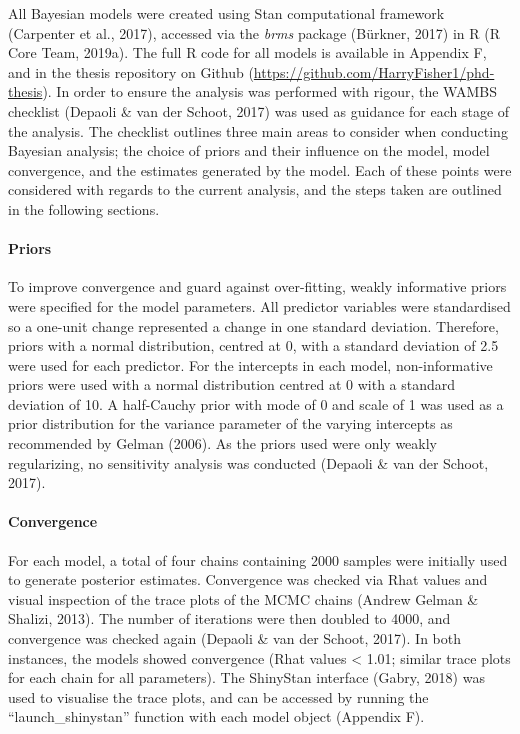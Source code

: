 \documentclass[man,floatsintext]{apa6}
\let\oldparagraph\paragraph
\renewcommand{\paragraph}[1]{\oldparagraph{#1}\mbox{}}
\begin{document}
All Bayesian models were created using Stan computational framework (Carpenter et al., 2017), accessed via the \emph{brms} package (Bürkner, 2017) in R (R Core Team, 2019a).
The full R code for all models is available in Appendix F, and in the thesis repository on Github (\url{https://github.com/HarryFisher1/phd-thesis}).
In order to ensure the analysis was performed with rigour, the WAMBS checklist (Depaoli \& van der Schoot, 2017) was used as guidance for each stage of the analysis.
The checklist outlines three main areas to consider when conducting Bayesian analysis; the choice of priors and their influence on the model, model convergence, and the estimates generated by the model.
Each of these points were considered with regards to the current analysis, and the steps taken are outlined in the following sections.

\hypertarget{priors}{%
\paragraph{Priors}\label{priors}}

To improve convergence and guard against over-fitting, weakly informative priors were specified for the model parameters.
All predictor variables were standardised so a one-unit change represented a change in one standard deviation.
Therefore, priors with a normal distribution, centred at 0, with a standard deviation of 2.5 were used for each predictor.
For the intercepts in each model, non-informative priors were used with a normal distribution centred at 0 with a standard deviation of 10.
A half-Cauchy prior with mode of 0 and scale of 1 was used as a prior distribution for the variance parameter of the varying intercepts as recommended by Gelman (2006).
As the priors used were only weakly regularizing, no sensitivity analysis was conducted (Depaoli \& van der Schoot, 2017).

\hypertarget{convergence}{%
\paragraph{Convergence}\label{convergence}}

For each model, a total of four chains containing 2000 samples were initially used to generate posterior estimates.
Convergence was checked via Rhat values and visual inspection of the trace plots of the MCMC chains (Andrew Gelman \& Shalizi, 2013).
The number of iterations were then doubled to 4000, and convergence was checked again (Depaoli \& van der Schoot, 2017).
In both instances, the models showed convergence (Rhat values \textless{} 1.01; similar trace plots for each chain for all parameters).
The ShinyStan interface (Gabry, 2018) was used to visualise the trace plots, and can be accessed by running the \enquote{launch\_shinystan} function with each model object (Appendix F).
\end{document}
